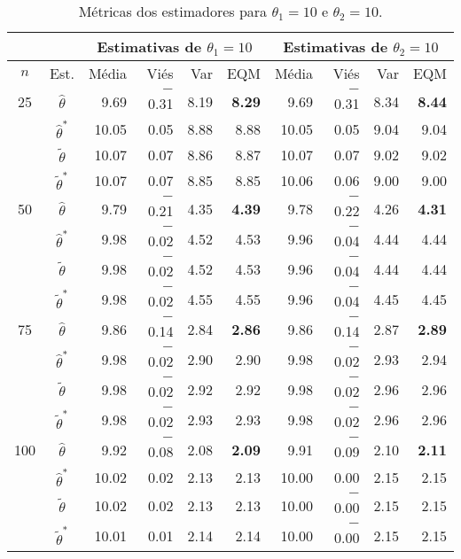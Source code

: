 \documentclass[12pt]{article}
\theoremstyle{definition}
\begin{document}
\begin{table}[htbp]
\centering
\begin{tabular}{c|c|rrrr|rrrr}
 \multicolumn{2}{c}{} & \multicolumn{4}{|c|}{Estimativas de $\theta_1 = 10$} &  \multicolumn{4}{c}{Estimativas de $\theta_2 = 10$} \\
  \hline
 $n$ & Est. & Média & Viés & Var & EQM & Média & Viés & Var & EQM \\ 
  \hline
  
  25 & $\hat{\theta}$ & 9.69 & $-$0.31 & 8.19 & \textbf{8.29} & 9.69 & $-$0.31 & 8.34 & \textbf{8.44} \\ 
     & $\hat{\theta}^*$ & 10.05 & 0.05 & 8.88 & 8.88 & 10.05 & 0.05 & 9.04 & 9.04 \\ 
     & $\tilde{\theta}$ & 10.07 & 0.07 & 8.86 & 8.87 & 10.07 & 0.07 & 9.02 & 9.02 \\ 
     & $\tilde{\theta}^*$ & 10.07 & 0.07 & 8.85 & 8.85 & 10.06 & 0.06 & 9.00 & 9.00 \\ 
   \hline
   
   50 & $\hat{\theta}$ & 9.79 & $-$0.21 & 4.35 & \textbf{4.39} & 9.78 & $-$0.22 & 4.26 & \textbf{4.31} \\ 
      & $\hat{\theta}^*$ & 9.98 & $-$0.02 & 4.52 & 4.53 & 9.96 & $-$0.04 & 4.44 & 4.44 \\ 
      & $\tilde{\theta}$ & 9.98 & $-$0.02 & 4.52 & 4.53 & 9.96 & $-$0.04 & 4.44 & 4.44 \\ 
      & $\tilde{\theta}^*$ & 9.98 & $-$0.02 & 4.55 & 4.55 & 9.96 & $-$0.04 & 4.45 & 4.45 \\

    \hline
    75 & $\hat{\theta}$ & 9.86 & $-$0.14 & 2.84 & \textbf{2.86} & 9.86 & $-$0.14 & 2.87 & \textbf{2.89} \\ 
        & $\hat{\theta}^*$ & 9.98 & $-$0.02 & 2.90 & 2.90 & 9.98 & $-$0.02 & 2.93 & 2.94 \\ 
        & $\tilde{\theta}$ & 9.98 & $-$0.02 & 2.92 & 2.92 & 9.98 & $-$0.02 & 2.96 & 2.96 \\ 
        & $\tilde{\theta}^*$ & 9.98 & $-$0.02 & 2.93 & 2.93 & 9.98 & $-$0.02 & 2.96 & 2.96 \\ 

    \hline
    100 & $\hat{\theta}$ & 9.92 & $-$0.08 & 2.08 & \textbf{2.09} & 9.91 & $-$0.09 & 2.10 & \textbf{2.11} \\ 
        & $\hat{\theta}^*$ & 10.02 & 0.02 & 2.13 & 2.13 & 10.00 & 0.00 & 2.15 & 2.15 \\ 
        & $\tilde{\theta}$ & 10.02 & 0.02 & 2.13 & 2.13 & 10.00 & $-$0.00 & 2.15 & 2.15 \\ 
        & $\tilde{\theta}^*$ & 10.01 & 0.01 & 2.14 & 2.14 & 10.00 & $-$0.00 & 2.15 & 2.15 \\ 
    \hline
\end{tabular}
\caption{Métricas dos estimadores para $\theta_1 = 10$ e $\theta_2 = 10$.}
\label{tab:10x10}
\end{table}
\end{document}
